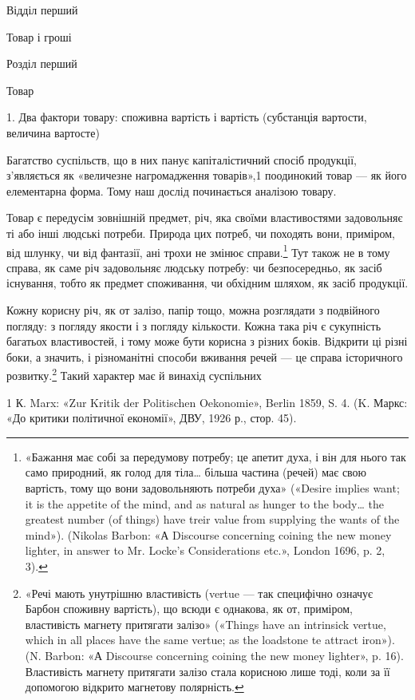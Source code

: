 Відділ перший

Товар і гроші

Розділ перший

Товар

1. Два фактори товару: споживна вартість і вартість (субстанція
вартости, величина вартосте)

Багатство суспільств, що в них панує капіталістичний спосіб
продукції, з’являється як «величезне нагромадження товарів»,1
поодинокий товар — як його елементарна форма. Тому наш
дослід починається аналізою товару.

Товар є передусім зовнішній предмет, річ, яка своїми властивостями
задовольняє ті або інші людські потреби. Природа цих
потреб, чи походять вони, приміром, від шлунку, чи від фантазії,
ані трохи не змінює справи.\footnote{
«Бажання має собі за передумову потребу; це апетит духа, і він
для нього так само природний, як голод для тіла\dots{} більша частина (речей)
має свою вартість, тому що вони задовольняють потреби духа» («Desire
implies want; it is the appetite of the mind, and as natural as hunger to
the body\dots{} the greatest number (of things) have treir value from supplying
the wants of the mind»). (Nikolas Barbon: «А Discourse concerning coining
the new money lighter, in answer to Mr. Locke’s Considerations
etc.», London 1696, p. 2, 3).
} Тут також не в тому справа, як саме
річ задовольняє людську потребу: чи безпосередньо, як засіб
існування, тобто як предмет споживання, чи обхідним шляхом,
як засіб продукції.

Кожну корисну річ, як от залізо, папір тощо, можна розглядати
з подвійного погляду: з погляду якости і з погляду кількости.
Кожна така річ є сукупність багатьох властивостей, і тому
може бути корисна з різних боків. Відкрити ці різні боки, а значить,
і різноманітні способи вживання речей — це справа історичного
розвитку.\footnote{
«Речі мають унутрішню властивість (vertue — так специфічно
означує Барбон споживну вартість), що всюди є однакова, як от, приміром,
властивість магнету притягати залізо» («Things have an intrinsick vertue,
which in all places have the same vertue; as the loadstone te attract iron»).
(N. Barbon: «А Discourse concerning coining the new money lighter»,
p. 16). Властивість магнету притягати залізо стала корисною лише тоді,
коли за її допомогою відкрито магнетову полярність.
} Такий характер має й винахід суспільних

1    К. Marx: «Zur Kritik der Politischen Oekonomie», Berlin 1859,
S. 4. (K. Маркс: «До критики політичної економії», ДВУ, 1926 р.,
стор. 45).
\parbreak{}  %

